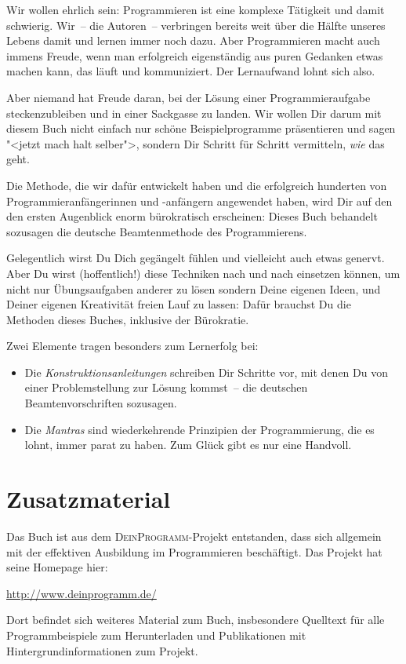 Wir wollen ehrlich sein: Programmieren ist eine komplexe Tätigkeit und
damit schwierig.  Wir~-- die Autoren~-- verbringen bereits weit über
die Hälfte unseres Lebens damit und lernen immer noch dazu.  Aber
Programmieren macht auch immens Freude, wenn man erfolgreich
eigenständig aus puren Gedanken etwas machen kann, das läuft und
kommuniziert.  Der Lernaufwand lohnt sich also.

Aber niemand hat Freude daran, bei der Lösung einer Programmieraufgabe
steckenzubleiben und in einer Sackgasse zu landen.  Wir wollen Dir
darum mit diesem Buch nicht einfach nur schöne Beispielprogramme
präsentieren und sagen "<jetzt mach halt selber">, sondern Dir Schritt
für Schritt vermitteln, \emph{wie} das geht.

Die Methode, die wir dafür entwickelt haben und die erfolgreich
hunderten von Programmieranfängerinnen und -anfängern angewendet
haben, wird Dir auf den den ersten Augenblick enorm bürokratisch
erscheinen: Dieses Buch behandelt sozusagen die deutsche
Beamtenmethode des Programmierens.

Gelegentlich wirst Du Dich gegängelt fühlen und vielleicht auch etwas
genervt.  Aber Du wirst (hoffentlich!) diese Techniken nach und nach
einsetzen können, um nicht nur Übungsaufgaben anderer zu lösen sondern
Deine eigenen Ideen, und Deiner eigenen Kreativität freien Lauf zu
lassen: Dafür brauchst Du die Methoden dieses Buches, inklusive der
Bürokratie.

Zwei Elemente tragen besonders zum Lernerfolg bei:
%
\begin{itemize}
\item Die \textit{Konstruktionsanleitungen} schreiben Dir Schritte
  vor, mit denen Du von einer Problemstellung zur Lösung kommst~-- die
  deutschen Beamtenvorschriften sozusagen.
\item Die \textit{Mantras} sind wiederkehrende Prinzipien der
  Programmierung, die es lohnt, immer parat zu haben.  Zum Glück gibt
  es nur eine Handvoll.
\end{itemize}
%

\section{Zusatzmaterial}

Das Buch ist aus dem \textsc{DeinProgramm}-Projekt entstanden, dass
sich allgemein mit der effektiven Ausbildung im Programmieren
beschäftigt.  Das Projekt hat seine Homepage hier:
%
\begin{center}
  \url{http://www.deinprogramm.de/}
\end{center}
%
Dort befindet sich weiteres Material zum Buch, insbesondere Quelltext
für alle Programmbeispiele zum Herunterladen und Publikationen mit
Hintergrundinformationen zum Projekt.



